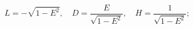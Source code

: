 \begin{equation}
L = -\sqrt{1-E^2}, \quad
D = \frac{E}{\sqrt{1-E^2}}, \quad
H = \frac{1}{\sqrt{1-E^2}};
\end{equation}

